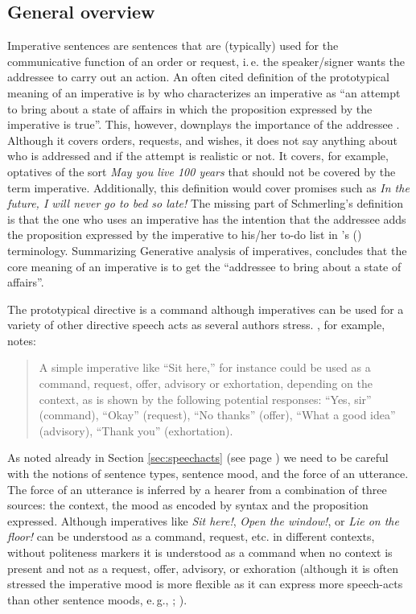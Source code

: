 \subsection{General overview}
Imperative sentences are sentences that are (typically) used for the communicative function of an order or request, i.\,e. the speaker/signer wants the addressee to carry out an action. An often cited definition of the prototypical meaning of an imperative is by \citet[212]{schmerling1982imperatives} who characterizes an imperative as ``an attempt to bring about a state of affairs in which the proposition expressed by the imperative is true''. This, however, downplays the importance of the addressee \citep[31]{van2007imperatives}. Although it covers orders, requests, and wishes, it does not say anything about who is addressed and if the attempt is realistic or not. It covers, for example, optatives of the sort \textit{May you live 100 years} that should not be covered by the term imperative. Additionally, this definition would cover promises such as \textit{In the future, I will never go to bed so late!} The missing part of Schmerling's definition is that the one who uses an imperative has the intention that the addressee adds the proposition expressed by the imperative to his/her to-do list in \citeauthor{portner2004semantics}'s (\citeyear{portner2004semantics}) terminology. Summarizing Generative analysis of imperatives, \citet[32]{van2007imperatives} concludes that the core meaning of an imperative is to get the ``addressee to bring about a state of affairs''. 

The prototypical directive is a command \citep[1--2]{aikhenval2010imp} although imperatives can be used for a variety of other directive speech acts as several authors stress. \citet[213]{clark1996using}, for example, notes:

\begin{quote}
A simple imperative like ``Sit here,'' for instance could be used as a command, request, offer, advisory or exhortation, depending on the context, as is shown by the following potential responses: ``Yes, sir'' (command), ``Okay'' (request), ``No thanks'' (offer), ``What a good idea'' (advisory), ``Thank you'' (exhortation).
\end{quote}

\noindent As noted already in Section \ref{sec:speechacts} (see page \pageref{threesources}) we need to be careful with the notions of sentence types, sentence mood, and the force of an utterance. The force of an utterance is inferred by a hearer from a combination of three sources: the context, the mood as encoded by syntax and the proposition expressed. Although imperatives like \textit{Sit here!}, \textit{Open the window!}, or \textit{Lie on the floor!} can be understood as a command, request, etc. in different contexts, without politeness markers it is understood as a command when no context is present and not as a request, offer, advisory, or exhoration (although it is often stressed the imperative mood is more flexible as it can express more speech-acts than other sentence moods, e.\,g., \citealt{portner2004semantics}; \citealt{kaufmann2012terpreting}).

